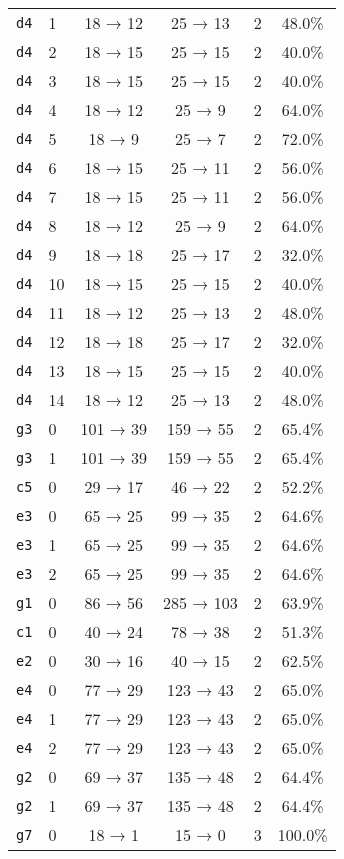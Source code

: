 \begin{tabular}{llcccc}
\texttt{d4} & 1 & 18 → 12 & 25 → 13 & 2 & 48.0\% \\
\texttt{d4} & 2 & 18 → 15 & 25 → 15 & 2 & 40.0\% \\
\texttt{d4} & 3 & 18 → 15 & 25 → 15 & 2 & 40.0\% \\
\texttt{d4} & 4 & 18 → 12 & 25 → 9 & 2 & 64.0\% \\
\texttt{d4} & 5 & 18 → 9 & 25 → 7 & 2 & 72.0\% \\
\texttt{d4} & 6 & 18 → 15 & 25 → 11 & 2 & 56.0\% \\
\texttt{d4} & 7 & 18 → 15 & 25 → 11 & 2 & 56.0\% \\
\texttt{d4} & 8 & 18 → 12 & 25 → 9 & 2 & 64.0\% \\
\texttt{d4} & 9 & 18 → 18 & 25 → 17 & 2 & 32.0\% \\
\texttt{d4} & 10 & 18 → 15 & 25 → 15 & 2 & 40.0\% \\
\texttt{d4} & 11 & 18 → 12 & 25 → 13 & 2 & 48.0\% \\
\texttt{d4} & 12 & 18 → 18 & 25 → 17 & 2 & 32.0\% \\
\texttt{d4} & 13 & 18 → 15 & 25 → 15 & 2 & 40.0\% \\
\texttt{d4} & 14 & 18 → 12 & 25 → 13 & 2 & 48.0\% \\
\texttt{g3} & 0 & 101 → 39 & 159 → 55 & 2 & 65.4\% \\
\texttt{g3} & 1 & 101 → 39 & 159 → 55 & 2 & 65.4\% \\
\texttt{c5} & 0 & 29 → 17 & 46 → 22 & 2 & 52.2\% \\
\texttt{e3} & 0 & 65 → 25 & 99 → 35 & 2 & 64.6\% \\
\texttt{e3} & 1 & 65 → 25 & 99 → 35 & 2 & 64.6\% \\
\texttt{e3} & 2 & 65 → 25 & 99 → 35 & 2 & 64.6\% \\
\texttt{g1} & 0 & 86 → 56 & 285 → 103 & 2 & 63.9\% \\
\texttt{c1} & 0 & 40 → 24 & 78 → 38 & 2 & 51.3\% \\
\texttt{e2} & 0 & 30 → 16 & 40 → 15 & 2 & 62.5\% \\
\texttt{e4} & 0 & 77 → 29 & 123 → 43 & 2 & 65.0\% \\
\texttt{e4} & 1 & 77 → 29 & 123 → 43 & 2 & 65.0\% \\
\texttt{e4} & 2 & 77 → 29 & 123 → 43 & 2 & 65.0\% \\
\texttt{g2} & 0 & 69 → 37 & 135 → 48 & 2 & 64.4\% \\
\texttt{g2} & 1 & 69 → 37 & 135 → 48 & 2 & 64.4\% \\
\texttt{g7} & 0 & 18 → 1 & 15 → 0 & 3 & 100.0\% \\

\end{tabular}
